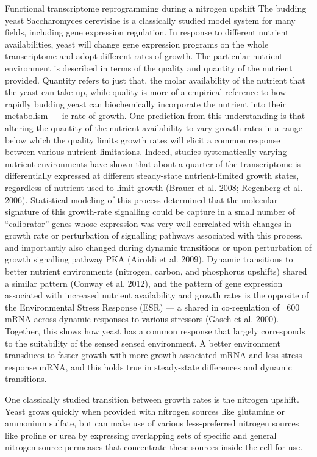 Functional transcriptome reprogramming during a
nitrogen upshift The budding yeast Saccharomyces cerevisiae is a
classically studied model system for many fields, including gene
expression regulation. In response to different nutrient
availabilities, yeast will change gene expression programs on the
whole transcriptome and adopt different rates of growth. The
particular nutrient environment is described in terms of the quality
and quantity of the nutrient provided. Quantity refers to just that,
the molar availability of the nutrient that the yeast can take up,
while quality is more of a empirical reference to how rapidly budding
yeast can biochemically incorporate the nutrient into their metabolism
--- ie rate of growth. One prediction from this understanding is that
altering the quantity of the nutrient availability to vary growth
rates in a range below which the quality limits growth rates will
elicit a common response between various nutrient limitations.
Indeed, studies systematically varying nutrient environments have
shown that about a quarter of the transcriptome is differentially
expressed at different steady-state nutrient-limited growth states,
regardless of nutrient used to limit growth (Brauer et al. 2008;
Regenberg et al. 2006). Statistical modeling of this process
determined that the molecular signature of this growth-rate signalling
could be capture in a small number of “calibrator” genes whose
expression was very well correlated with changes in growth rate or
perturbation of signalling pathways associated with this process, and
importantly also changed during dynamic transitions or upon
perturbation of growth signalling pathway PKA (Airoldi et al. 2009).
Dynamic transitions to better nutrient environments (nitrogen, carbon,
and phosphorus upshifts) shared a similar pattern (Conway et al.
2012), and the pattern of gene expression associated with increased
nutrient availability and growth rates is the opposite of the
Environmental Stress Response (ESR) --- a shared in co-regulation of
~600 mRNA across dynamic responses to various stressors (Gasch et al.
2000). Together, this shows how yeast has a common response that
largely corresponds to the suitability of the sensed sensed
environment. A better environment transduces to faster growth with
more growth associated mRNA and less stress response mRNA, and this
holds true in steady-state differences and dynamic transitions.  

One
classically studied transition between growth rates is the nitrogen
upshift. Yeast grows quickly when provided with nitrogen sources like
glutamine or ammonium sulfate, but can make use of various
less-preferred nitrogen sources like proline or urea by expressing
overlapping sets of specific and general nitrogen-source permeases
that concentrate these sources inside the cell for use.  

